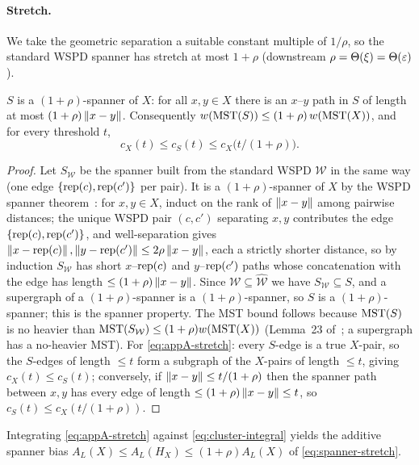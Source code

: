 \paragraph{Stretch.}
We take the geometric separation a suitable constant multiple of $1/\rho$, so the standard WSPD spanner has
stretch at most $1+\rho$ (downstream $\rho=\Theta(\xi)=\Theta(\varepsilon)$).

\begin{lemma}\label{lem:stretch}
$S$ is a $(1+\rho)$-spanner of $X$: for all $x,y\in X$ there is an $x$--$y$ path in $S$ of length at most
$(1+\rho)\left\lVert x-y \right\rVert$. Consequently $w(\mathrm{MST}(S))\le(1+\rho)\,w(\mathrm{MST}(X))$, and for every threshold $t$,
\begin{equation}\label{eq:appA-stretch}
  c_X(t)\le c_S(t)\le c_X\!\bigl(t/(1+\rho)\bigr).
\end{equation}
\end{lemma}

\begin{proof}
Let $S_{\mathcal W}$ be the spanner built from the standard WSPD $\mathcal W$ in the same way (one edge
$\{\operatorname{rep}(c),\operatorname{rep}(c')\}$ per pair). It is a $(1+\rho)$-spanner of $X$ by the WSPD spanner
theorem~\cite[Thm.~on WSPD spanners]{HarPeled11}: for $x,y\in X$, induct on the rank of $\left\lVert x-y \right\rVert$ among
pairwise distances; the unique WSPD pair $(c,c')$ separating $x,y$ contributes the edge $\{\operatorname{rep}(c),
\operatorname{rep}(c')\}$, and well-separation gives $\left\lVert x-\operatorname{rep}(c) \right\rVert,\left\lVert y-\operatorname{rep}(c') \right\rVert\le 2\rho\left\lVert x-y \right\rVert$, each a
strictly shorter distance, so by induction $S_{\mathcal W}$ has short $x$--$\operatorname{rep}(c)$ and $y$--$\operatorname{rep}(c')$
paths whose concatenation with the edge has length $\le(1+\rho)\left\lVert x-y \right\rVert$. Since $\mathcal W\subseteq
\widehat{\mathcal W}$ we have $S_{\mathcal W}\subseteq S$, and a supergraph of a $(1+\rho)$-spanner is a
$(1+\rho)$-spanner, so $S$ is a $(1+\rho)$-spanner; this is the spanner property. The MST bound follows
because $\mathrm{MST}(S)$ is no heavier than $\mathrm{MST}(S_{\mathcal W})\le(1+\rho)w(\mathrm{MST}(X))$ (Lemma~23
of~\cite{DMOSW25}; a supergraph has a no-heavier MST). For \eqref{eq:appA-stretch}: every $S$-edge is a
true $X$-pair, so the $S$-edges of length $\le t$ form a subgraph of the $X$-pairs of length $\le t$,
giving $c_X(t)\le c_S(t)$; conversely, if $\left\lVert x-y \right\rVert\le t/(1+\rho)$ then the spanner path between $x,y$ has
every edge of length $\le(1+\rho)\left\lVert x-y \right\rVert\le t$, so $c_S(t)\le c_X(t/(1+\rho))$.
\end{proof}

Integrating \eqref{eq:appA-stretch} against \eqref{eq:cluster-integral} yields the additive spanner bias
$A_L(X)\le A_L(H_X)\le(1+\rho)A_L(X)$ of \eqref{eq:spanner-stretch}.

